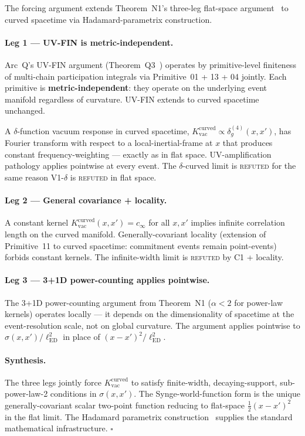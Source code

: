 \documentclass[11pt,a4paper]{article}
\begin{document}
The forcing argument extends Theorem~N1's three-leg flat-space argument~\cite{arcn} to curved spacetime via Hadamard-parametrix construction.

\paragraph{Leg 1 --- UV-FIN is metric-independent.}
Arc~Q's UV-FIN argument (Theorem~Q3~\cite{arcq}) operates by primitive-level finiteness of multi-chain participation integrals via Primitive~01 + 13 + 04 jointly. Each primitive is \textbf{metric-independent}: they operate on the underlying event manifold regardless of curvature. UV-FIN extends to curved spacetime unchanged.

A $\delta$-function vacuum response in curved spacetime, $K_\mathrm{vac}^\mathrm{curved} \propto \delta_g^{(4)}(x, x')$, has Fourier transform with respect to a local-inertial-frame at $x$ that produces constant frequency-weighting --- exactly as in flat space. UV-amplification pathology applies pointwise at every event. The $\delta$-curved limit is \textsc{refuted} for the same reason V1-$\delta$ is \textsc{refuted} in flat space.

\paragraph{Leg 2 --- General covariance + locality.}
A constant kernel $K_\mathrm{vac}^\mathrm{curved}(x, x') = c_\infty$ for all $x, x'$ implies infinite correlation length on the curved manifold. Generally-covariant locality (extension of Primitive~11 to curved spacetime: commitment events remain point-events) forbids constant kernels. The infinite-width limit is \textsc{refuted} by C1 + locality.

\paragraph{Leg 3 --- 3+1D power-counting applies pointwise.}
The 3+1D power-counting argument from Theorem~N1 ($\alpha < 2$ for power-law kernels) operates locally --- it depends on the dimensionality of spacetime at the event-resolution scale, not on global curvature. The argument applies pointwise to $\sigma(x, x') / \ell_\mathrm{ED}^2$ in place of $(x - x')^2 / \ell_\mathrm{ED}^2$.

\paragraph{Synthesis.}
The three legs jointly force $K_\mathrm{vac}^\mathrm{curved}$ to satisfy finite-width, decaying-support, sub-power-law-2 conditions in $\sigma(x, x')$. The Synge-world-function form is the unique generally-covariant scalar two-point function reducing to flat-space $\tfrac{1}{2}(x - x')^2$ in the flat limit. The Hadamard parametrix construction~\cite{dewitt, wald} supplies the standard mathematical infrastructure. $\square$
\end{document}
